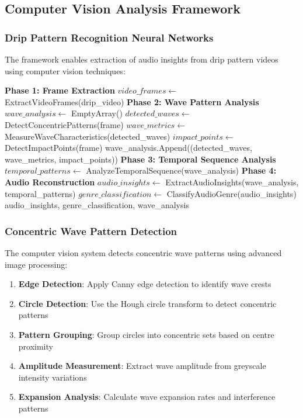 \documentclass[12pt,a4paper]{article}
\begin{document}
\subsection{Computer Vision Analysis Framework}

\subsubsection{Drip Pattern Recognition Neural Networks}

The framework enables extraction of audio insights from drip pattern videos using computer vision techniques:

\begin{algorithm}[H]
\caption{Computer Vision Drip Pattern Analysis}
\begin{algorithmic}[1]
    \State \textbf{Phase 1: Frame Extraction}
    \State $video\_frames \gets$ ExtractVideoFrames(drip\_video)
    \State \textbf{Phase 2: Wave Pattern Analysis}
    \State $wave\_analysis \gets$ EmptyArray()
        \State $detected\_waves \gets$ DetectConcentricPatterns(frame)
        \State $wave\_metrics \gets$ MeasureWaveCharacteristics(detected\_waves)
        \State $impact\_points \gets$ DetectImpactPoints(frame)
        \State wave\_analysis.Append((detected\_waves, wave\_metrics, impact\_points))
    \EndFor
    \State \textbf{Phase 3: Temporal Sequence Analysis}
    \State $temporal\_patterns \gets$ AnalyzeTemporalSequence(wave\_analysis)
    \State \textbf{Phase 4: Audio Reconstruction}
    \State $audio\_insights \gets$ ExtractAudioInsights(wave\_analysis, temporal\_patterns)
    \State $genre\_classification \gets$ ClassifyAudioGenre(audio\_insights)
    \State \Return audio\_insights, genre\_classification, wave\_analysis
\EndProcedure
\end{algorithmic}
\end{algorithm}

\subsubsection{Concentric Wave Pattern Detection}

The computer vision system detects concentric wave patterns using advanced image processing:

\begin{enumerate}
\item \textbf{Edge Detection}: Apply Canny edge detection to identify wave crests
\item \textbf{Circle Detection}: Use the Hough circle transform to detect concentric patterns
\item \textbf{Pattern Grouping}: Group circles into concentric sets based on centre proximity
\item \textbf{Amplitude Measurement}: Extract wave amplitude from greyscale intensity variations
\item \textbf{Expansion Analysis}: Calculate wave expansion rates and interference patterns
\end{enumerate}
\end{document}

